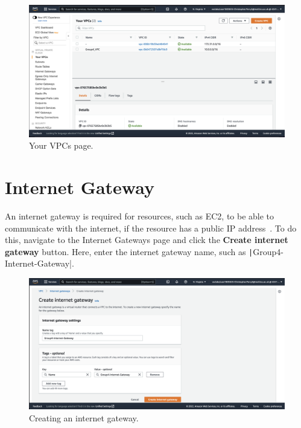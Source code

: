 \begin{figure}[!htbp]
    \centering
    \includegraphics[width=150mm]{resources/vpc/your_vpcs}
    \caption{Your VPCs page.}
    \label{fig:vpc-step-5}
\end{figure}

\clearpage
\section{Internet Gateway}\label{sec:internet-gateway}

An internet gateway is required for resources, such as EC2, to be able to communicate with the internet, if the resource
has a public IP address~\parencite{amazon2022connect}.
To do this, navigate to the Internet Gateways page and click the \textbf{Create internet gateway} button.
Here, enter the internet gateway name, such as \texttt|Group4-Internet-Gateway|.

\begin{figure}[!htbp]
    \centering
    \includegraphics[width=150mm]{resources/vpc/internet-gateway-1}
    \caption{Creating an internet gateway.}
    \label{fig:internet-gateway-1}
\end{figure}

